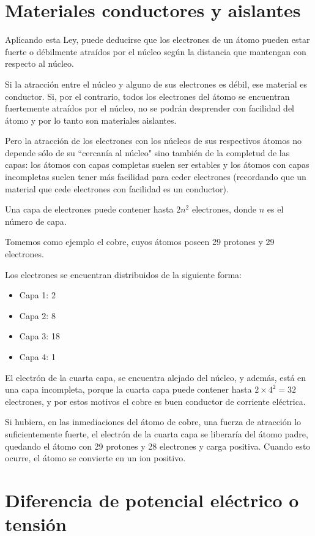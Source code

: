 \section{Materiales conductores y aislantes}

Aplicando esta Ley, puede deducirse que los electrones de un átomo pueden estar fuerte o débilmente atraídos por el núcleo según la distancia que mantengan con respecto al núcleo.

Si la atracción entre el núcleo y alguno de sus electrones es débil, ese material es conductor. Si, por el contrario, todos los electrones del átomo se encuentran fuertemente atraídos por el núcleo, no se podrán desprender con facilidad del átomo y por lo tanto son materiales aislantes.

Pero la atracción de los electrones con los núcleos de sus respectivos átomos no depende sólo de su ``cercanía al núcleo" sino también de la completud de las capas: los átomos con capas completas suelen ser estables y los átomos con capas incompletas suelen tener más facilidad para ceder electrones (recordando que un material que cede electrones con facilidad es un conductor).

Una capa de electrones puede contener hasta $2n^{2}$ electrones, donde $n$ es el número de capa.

Tomemos como ejemplo el cobre, cuyos átomos poseen 29 protones y 29 electrones.

Los electrones se encuentran distribuidos de la siguiente forma:
\begin{itemize}
	\item Capa 1: 2
	\item Capa 2: 8
	\item Capa 3: 18
	\item Capa 4: 1
\end{itemize}

El electrón de la cuarta capa, se encuentra alejado del núcleo, y además, está en una capa incompleta, porque la cuarta capa puede contener hasta $2\times 4^{2}=32$ electrones, y por estos motivos el cobre es buen conductor de corriente eléctrica.

Si hubiera, en las inmediaciones del átomo de cobre, una fuerza de atracción lo suficientemente fuerte, el electrón de la cuarta capa se liberaría del átomo padre, quedando el átomo con 29 protones y 28 electrones y carga positiva. Cuando esto ocurre, el átomo se convierte en un ion positivo.

\section{Diferencia de potencial eléctrico o tensión}

